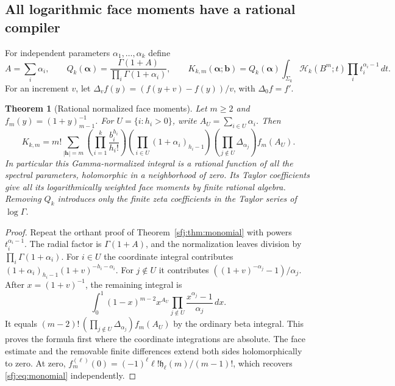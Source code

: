 \documentclass[11pt,letterpaper]{article}
\numberwithin{equation}{section}
\newtheorem{theorem}{Theorem}[section]
\theoremstyle{definition}
\theoremstyle{remark}
\begin{document}
\subsection{All logarithmic face moments have a rational compiler}

For independent parameters $\alpha_1,\ldots,\alpha_k$ define
\[
 A=\sum_i\alpha_i,\qquad
 Q_k(\boldsymbol\alpha)=
       \frac{\Gamma(1+A)}{\prod_i\Gamma(1+\alpha_i)},\qquad
 K_{k,m}(\boldsymbol\alpha;\boldsymbol b)
   =Q_k(\boldsymbol\alpha)
       \int_{\Sigma_k}\mathcal H_k(B^m;t)
                                      \prod_i t_i^{\alpha_i-1}\,dt.
\]
For an increment $v$, let
$\Delta_v f(y)=(f(y+v)-f(y))/v$, with $\Delta_0f=f'$.

\begin{theorem}[Rational normalized face moments]
\label{sfj:thm:rational}
Let $m\ge2$ and $f_m(y)=(1+y)_{m-1}^{-1}$.  For
$U=\{i:h_i>0\}$, write $A_U=\sum_{i\in U}\alpha_i$.  Then
\begin{equation}\label{sfj:eq:rational}
 \boxed{\displaystyle
 K_{k,m}=m!\sum_{|\boldsymbol h|=m}
  \left(\prod_{i=1}^k\frac{b_i^{h_i}}{h_i!}\right)
  \left(\prod_{i\in U}(1+\alpha_i)_{h_i-1}\right)
  \left(\prod_{j\notin U}\Delta_{\alpha_j}\right)f_m(A_U).}
\end{equation}
In particular this Gamma-normalized integral is a rational function of
all the spectral parameters, holomorphic in a neighborhood of zero.
Its Taylor coefficients give all its logarithmically weighted face
moments by finite rational algebra.  Removing $Q_k$ introduces only
the finite zeta coefficients in the Taylor series of $\log\Gamma$.
\end{theorem}
\begin{proof}
Repeat the orthant proof of Theorem~\ref{sfj:thm:monomial} with powers
$t_i^{\alpha_i-1}$.  The radial factor is $\Gamma(1+A)$, and the
normalization leaves division by $\prod_i\Gamma(1+\alpha_i)$.
For $i\in U$ the coordinate integral contributes
$(1+\alpha_i)_{h_i-1}(1+v)^{-h_i-\alpha_i}$.  For $j\notin U$
it contributes
$((1+v)^{-\alpha_j}-1)/\alpha_j$.
After $x=(1+v)^{-1}$, the remaining integral is
\[
 \int_0^1(1-x)^{m-2}x^{A_U}
            \prod_{j\notin U}\frac{x^{\alpha_j}-1}{\alpha_j}\,dx.
\]
It equals
$(m-2)!\,(\prod_{j\notin U}\Delta_{\alpha_j})f_m(A_U)$ by the
ordinary beta integral.  This proves the formula first where the
coordinate integrations are absolute.  The face estimate and the
removable finite differences extend both sides holomorphically to
zero.  At zero, $f_m^{(\ell)}(0)=
(-1)^\ell\ell!\mathfrak h_\ell(m)/(m-1)!$, which recovers
\eqref{sfj:eq:monomial} independently.
\end{proof}
\end{document}
